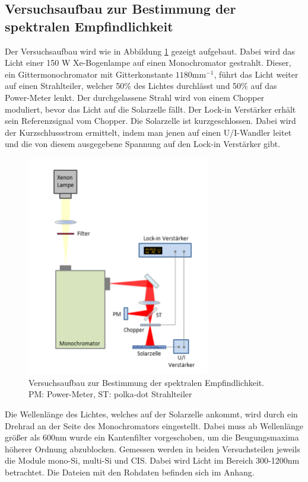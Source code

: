 
\subsection{Versuchsaufbau zur Bestimmung der spektralen Empfindlichkeit}



Der Versuchsaufbau wird wie in Abbildung \ref{Versuch1} gezeigt aufgebaut. Dabei wird das Licht einer 150 W Xe-Bogenlampe auf einen Monochromator gestrahlt. 
Dieser, ein Gittermonochromator mit Gitterkonstante $1180 \mathrm{mm}^{-1}$, führt das Licht weiter auf einen Strahlteiler, welcher 50\% des Lichtes 
durchlässt und 50\% auf das Power-Meter lenkt. Der durchgelassene Strahl wird von einem Chopper moduliert, bevor das Licht auf die Solarzelle 
fällt. Der Lock-in Verstärker erhält sein Referenzsignal vom Chopper. Die Solarzelle ist kurzgeschlossen. Dabei wird der Kurzschlussstrom ermittelt, indem 
man jenen auf einen U/I-Wandler leitet und die von diesem ausgegebene Spannung auf den Lock-in Verstärker gibt. 

\begin{figure}[ht]
    \captionsetup{justification=centering,margin=2cm}
    \centering
    \includegraphics[width =8cm]{Bilder/Versuchsaufbau1.png}
    \caption{Versuchsaufbau zur Bestimmung der spektralen
    Empfindlichkeit. PM: Power-Meter, ST: polka-dot Strahlteiler
    }
    \label{Versuch1}
\end{figure}

Die Wellenlänge des Lichtes, welches auf der Solarzelle ankommt, wird durch ein Drehrad an der Seite des Monochromators eingestellt. Dabei muss ab 
Wellenlänge größer als 600nm wurde ein Kantenfilter vorgeschoben, um die Beugungsmaxima höherer Ordnung abzublocken. Gemessen werden in 
beiden Versuchsteilen jeweils die Module mono-Si, multi-Si und CIS. Dabei wird 
Licht im Bereich 300-1200nm betrachtet. Die Dateien mit den Rohdaten befinden sich im Anhang.


